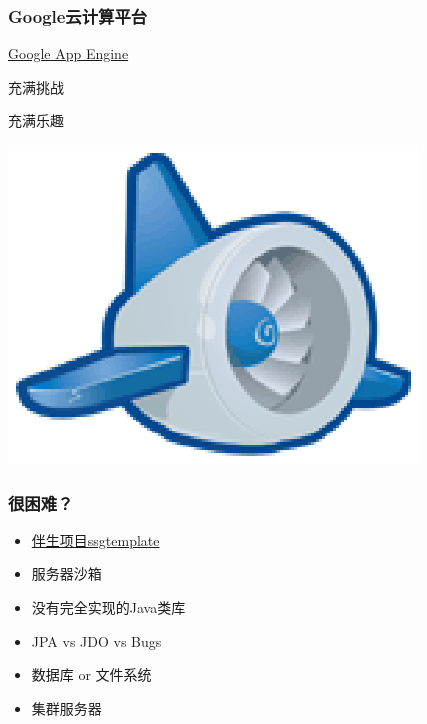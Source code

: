 \documentclass[dvipdfm,serif,mathserif]{beamer}
\begin{document}
\begin{frame}
  \frametitle{Google云计算平台}
\begin{itemize}
\begin{minipage}[c]{0.6\textwidth}
 \item \href{http://code.google.com/appengine/}{\color{blue}Google App Engine}
 \item 充满挑战
 \item 充满乐趣
  \end{minipage}
  \begin{minipage}[c]{0.3\textwidth}
  \includegraphics[width=\textwidth]{appengine_lowres.ps}
  \end{minipage}
\end{itemize}
\end{frame}

\begin{frame}
  \frametitle{很困难？}
\begin{itemize}
 \item \href{http://code.google.com/p/ssgtemplate/}{\color{blue}伴生项目ssgtemplate}
\item 服务器沙箱
\item 没有完全实现的Java类库
\item JPA vs JDO vs Bugs
\item 数据库 or 文件系统
\item 集群服务器
\end{itemize}
\end{frame}
\end{document}
